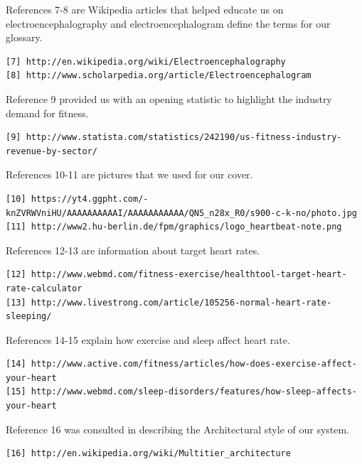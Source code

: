 \documentclass[letterpaper,english, 12pt]{scrreprt}
\begin{document}
References 7-8 are Wikipedia articles that helped educate us on electroencephalography and electroencephalogram define the terms for our glossary.
\begin{verbatim}
[7] http://en.wikipedia.org/wiki/Electroencephalography
[8] http://www.scholarpedia.org/article/Electroencephalogram
\end{verbatim}

Reference 9 provided us with an opening statistic to highlight the industry demand for fitness.
\begin{verbatim}
[9] http://www.statista.com/statistics/242190/us-fitness-industry-revenue-by-sector/
\end{verbatim}

References 10-11 are pictures that we used for our cover.
\begin{verbatim}
[10] https://yt4.ggpht.com/-knZVRWVniHU/AAAAAAAAAAI/AAAAAAAAAAA/QN5_n28x_R0/s900-c-k-no/photo.jpg
[11] http://www2.hu-berlin.de/fpm/graphics/logo_heartbeat-note.png
\end{verbatim}


References 12-13 are information about target heart rates.
\begin{verbatim}
[12] http://www.webmd.com/fitness-exercise/healthtool-target-heart-rate-calculator
[13] http://www.livestrong.com/article/105256-normal-heart-rate-sleeping/
\end{verbatim}

References 14-15 explain how exercise and sleep affect heart rate.
\begin{verbatim}
[14] http://www.active.com/fitness/articles/how-does-exercise-affect-your-heart
[15] http://www.webmd.com/sleep-disorders/features/how-sleep-affects-your-heart
\end{verbatim}

Reference 16 was consulted in describing the Architectural style of our system.
\begin{verbatim}
[16] http://en.wikipedia.org/wiki/Multitier_architecture
\end{verbatim}
\end{document}
